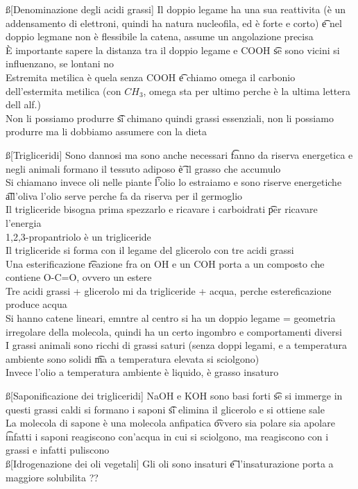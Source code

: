 \documentclass[12pt]{article}
\begin{document}
\ss[Denominazione degli acidi grassi]
Il doppio legame ha una sua reattivita (è un addensamento di elettroni, quindi ha natura nucleofila, ed è forte e corto) \t e nel doppio legmane non è flessibile la catena, assume un angolazione precisa \\
È importante sapere la distanza tra il doppio legame e COOH \t se sono vicini si influenzano, se lontani no \\
Estremita metilica è quela senza COOH \t e chiamo omega il carbonio dell'estermita metilica (con $CH_3$, omega sta per ultimo perche è la ultima lettera dell alf.) \\
Non li possiamo produrre \t si chimano quindi grassi essenziali, non li possiamo produrre ma li dobbiamo assumere con la dieta 

\ss[Trigliceridi]
Sono dannosi ma sono anche necessari \t fanno da riserva energetica e negli animali formano il tessuto adiposo \t è il grasso che accumulo \\
Si chiamano invece oli nelle piante \t l'olio lo estraiamo e sono riserve energetiche \t all'oliva l'olio serve perche fa da riserva per il germoglio \\
Il trigliceride bisogna prima spezzarlo e ricavare i carboidrati \t per ricavare l'energia \\
1,2,3-propantriolo è un trigliceride \\
Il trigliceride si forma con il legame del glicerolo con tre acidi grassi \\
Una esterificazione \t reazione fra on OH e un COH porta a un composto che contiene O-C=O, ovvero un estere \\
Tre acidi grassi + glicerolo mi da trigliceride + acqua, perche estereficazione produce acqua \\
Si hanno catene lineari, emntre al centro si ha un doppio legame = geometria irregolare della molecola, quindi ha un certo ingombro e comportamenti diversi \\
I grassi animali sono ricchi di grassi saturi (senza doppi legami, e a temperatura ambiente sono solidi \t ma a temperatura elevata si sciolgono) \\
Invece l'olio a temperatura ambiente è liquido, è grasso insaturo

\ss[Saponificazione dei trigliceridi]
NaOH e KOH sono basi forti \t se si immerge in questi grassi caldi si formano i saponi \t si elimina il glicerolo e si ottiene sale \\
La molecola di sapone è una molecola anfipatica \t ovvero sia polare sia apolare \t infatti i saponi reagiscono con'acqua in cui si sciolgono, ma reagiscono con i grassi e infatti puliscono \\

\ss[Idrogenazione dei oli vegetali]
Gli oli sono insaturi \t e l'insaturazione porta a maggiore solubilita ??
\end{document}
